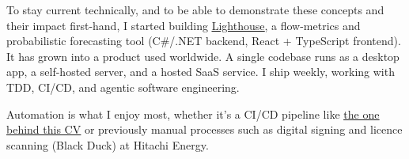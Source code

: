 \begin{cvparagraph}
{	To stay current technically, and to be able to demonstrate these concepts and their impact first-hand, I started building \underline{\href{https://letpeople.work/lighthouse}{Lighthouse}}, a flow-metrics and probabilistic forecasting tool (C\#/.NET backend, React + TypeScript frontend). It has grown into a product used worldwide. A single codebase runs as a desktop app, a self-hosted server, and a hosted SaaS service. I ship weekly, working with TDD, CI/CD, and agentic software engineering.

	Automation is what I enjoy most, whether it's a CI/CD pipeline like \underline{\href{https://github.com/huserben/cv/actions}{the one behind this CV}} or previously manual processes such as digital signing and licence scanning (Black Duck) at Hitachi Energy.
}
\end{cvparagraph}
